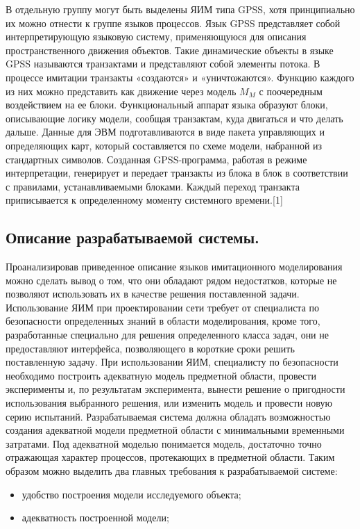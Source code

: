     В отдельную группу могут быть выделены ЯИМ типа GPSS, хотя принципиально их можно отнести к группе языков процессов. Язык GPSS представляет собой интерпретирующую языковую систему, применяющуюся для описания  пространственного движения объектов. Такие динамические объекты в языке GPSS называются транзактами и представляют собой элементы потока. В процессе имитации транзакты «создаются» и «уничтожаются». Функцию каждого из них можно представить как движение через модель $M_{M}$ с поочередным воздействием на ее блоки. Функциональный аппарат языка образуют блоки, описывающие логику модели, сообщая транзактам, куда двигаться и что делать дальше. Данные для ЭВМ подготавливаются в виде пакета управляющих и определяющих карт, который составляется по схеме модели, набранной из стандартных символов. Созданная GPSS-программа, работая в режиме интерпретации, генерирует и передает транзакты из блока в блок в соответствии с правилами, устанавливаемыми блоками. Каждый переход транзакта приписывается к  определенному моменту системного времени.[1]


\subsection{Описание разрабатываемой системы.}

    Проанализировав приведенное описание языков имитационного моделирования можно сделать вывод о том, что они обладают рядом недостатков, которые не позволяют использовать их в качестве решения поставленной задачи. Использование ЯИМ при проектировании сети требует от специалиста по безопасности определенных знаний в области моделирования, кроме того, разработанные специально для решения определенного класса задач, они не предоставляют интерфейса, позволяющего в короткие сроки решить поставленную задачу. При использовании ЯИМ, специалисту по безопасности необходимо построить адекватную модель предметной области, провести эксперименты и, по результатам эксперимента, вынести решение о пригодности использования выбранного решения, или изменить модель и провести новую серию испытаний.
    Разрабатываемая система должна обладать возможностью создания адекватной модели предметной области с минимальными временными затратами. Под адекватной моделью понимается модель, достаточно точно отражающая характер процессов, протекающих в предметной области. Таким образом можно выделить два главных требования к разрабатываемой системе:

\begin{itemize}
    \item удобство построения модели исследуемого объекта;
    \item адекватность построенной модели;
\end{itemize}

